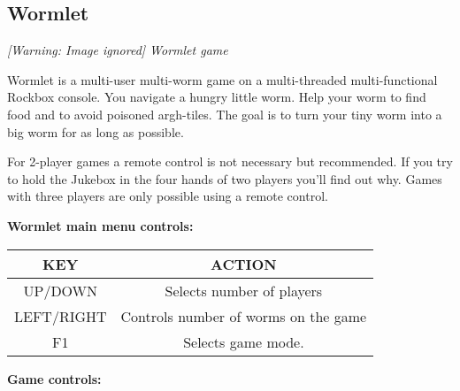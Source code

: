 \subsection{Wormlet}
{\centering\itshape
  [Warning: Image ignored] %
 \newline
Wormlet game
\par}

Wormlet is a multi{}-user multi{}-worm game on a multi{}-threaded
multi{}-functional Rockbox console. You navigate a hungry little worm.
Help your worm to find food and to avoid poisoned argh{}-tiles. The
goal is to turn your tiny worm into a big worm for as long as possible.

For 2{}-player games a remote control is not necessary but recommended.
If you try to hold the Jukebox in the four hands of two players
you'll find out why. Games with three players are only
possible using a remote control.

{\bfseries
Wormlet main menu controls:}

\begin{table}[h!]
\begin{center}
\begin{tabular}{|c|c|}
\hline
KEY & ACTION \\\hline
UP/DOWN & Selects number of players \\\hline
LEFT/RIGHT & Controls number of worms on the game \\\hline
F1 & Selects game mode. \\\hline
\end{tabular}
\end{center}
\end{table}

{\bfseries
Game controls:}

